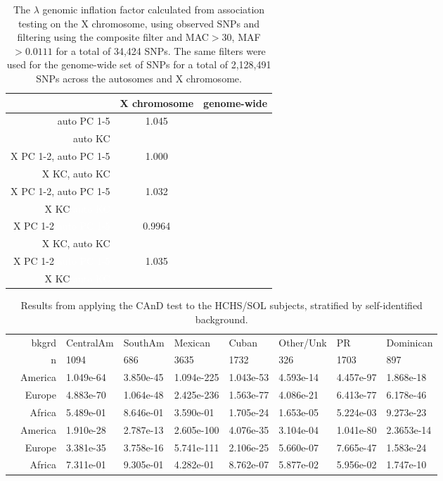 \documentclass[11pt]{article} %
\begin{document}
\begin{table}[h!]
\centering
\begin{tabular}{r|cc}
  \hline
 & X chromosome & genome-wide \\ 
  \hline
auto PC 1-5 & \multirow{2}{*}{1.045}&\multirow{2}{*}{} \\
auto KC && \\ \hline
X PC 1-2, auto PC 1-5&\multirow{2}{*}{1.000} & \multirow{2}{*}{} \\ 
X KC, auto KC & & \\ \hline
X PC 1-2, auto PC 1-5 & \multirow{2}{*}{1.032} & \multirow{2}{*}{} \\
X KC \textcolor{white}{auto KC} & & \\ \hline
X PC 1-2 \textcolor{white}{auto PC 1-5}& \multirow{2}{*}{0.9964} & \multirow{2}{*}{} \\
X KC, auto KC & & \\ \hline
X PC 1-2 \textcolor{white}{auto PC 1-5} & \multirow{2}{*}{1.035} & \multirow{2}{*}{} \\
X KC \textcolor{white}{auto KC} & & \\ \hline 
\end{tabular}
\caption{The $\lambda$ genomic inflation factor calculated from association testing on the X chromosome, using observed SNPs and filtering using the composite filter and MAC$>$30, MAF$>0.0111$ for a total of 34,424 SNPs. The same filters were used for the genome-wide set of SNPs for a total of 2,128,491 SNPs across the autosomes and X chromosome.}
\label{table:lambda_bmi}
\end{table}

\begin{table}[ht]
\centering
\begin{tabular}{rr|lllllll}
  \hline
 &bkgrd & CentralAm & SouthAm & Mexican & Cuban & Other/Unk & PR & Dominican \\ 
  &n & 1094 &  686 & 3635 & 1732 &  326 & 1703 &  897 \\ \hline
\parbox[t]{2mm}{}&  America &  1.049e-64 &  3.850e-45 & 1.094e-225 &  1.043e-53 &  4.593e-14 &  4.457e-97 &  1.868e-18 \\ 
&  Europe&  4.883e-70 &  1.064e-48 & 2.425e-236 &  1.563e-77 &  4.086e-21 &  6.413e-77 &  6.178e-46 \\ 
 & Africa & 5.489e-01 & 8.646e-01 & 3.590e-01 & 1.705e-24 & 1.653e-05 & 5.224e-03 & 9.273e-23 \\  \hline
\parbox[t]{2mm}{}& America &  1.910e-28 &  2.787e-13 & 2.605e-100 &  4.076e-35 &  3.104e-04 &  1.041e-80 &  2.3653e-14 \\ 
  &Europe &  3.381e-35 &  3.758e-16 & 5.741e-111 &  2.106e-25 &  5.660e-07 &  7.665e-47 &  1.583e-24 \\ 
  &Africa & 7.311e-01 & 9.305e-01 & 4.282e-01 & 8.762e-07 & 5.877e-02 & 5.956e-02 & 1.747e-10 \\ 
   \hline
\end{tabular}
\caption{Results from applying the CAnD test to the HCHS/SOL subjects, stratified by self-identified background.}
\end{table}
\end{document}
